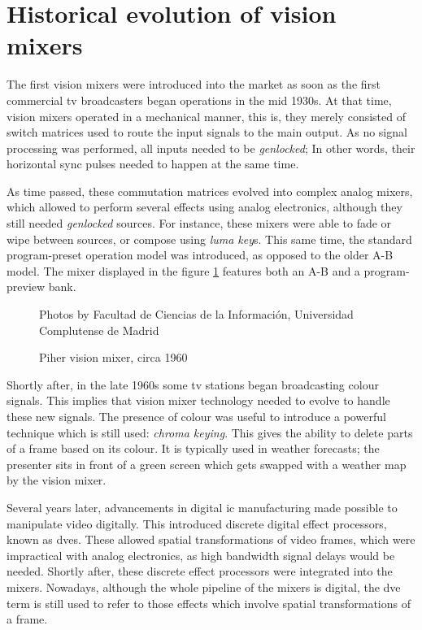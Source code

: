\documentclass[../main.tex]{subfiles}
\begin{document}
\section{Historical evolution of vision mixers}
The first vision mixers were introduced into the market as soon as the first commercial \gls{tv} broadcasters began operations in the mid 1930s. At that time, vision mixers operated in a mechanical manner, this is, they merely consisted of switch matrices used to route the input signals to the main output. As no signal processing was performed, all inputs needed to be \textit{genlocked}; In other words, their horizontal sync pulses needed to happen at the same time\cite{becg2020}.\newline

As time passed, these commutation matrices evolved into complex analog mixers, which allowed to perform several effects using analog electronics, although they still needed \textit{genlocked} sources. For instance, these mixers were able to fade or wipe between sources, or compose using \textit{luma key}s\cite{WardPeter2001Saob}. This same time, the standard program-preset operation model was introduced, as opposed to the older A-B model. The mixer displayed in the figure \ref{fig:piher} features both an A-B and a program-preview bank.\newline

\begin{figure}[htbp]
    \centering
    \footnotesize{Photos by Facultad de Ciencias de la Información, Universidad Complutense de Madrid}

    \caption{Piher vision mixer, circa 1960}
    \label{fig:piher}
\end{figure}

Shortly after, in the late 1960s some \gls{tv} stations began broadcasting colour signals. This implies that vision mixer technology needed to evolve to handle these new signals. The presence of colour was useful to introduce a powerful technique which is still used: \textit{chroma keying}\cite{jpeters}\cite{tmMixerHistory}. This gives the ability to delete parts of a frame based on its colour. It is typically used in weather forecasts; the presenter sits in front of a green screen which gets swapped with a weather map by the vision mixer.\newline

Several years later, advancements in digital \gls{ic} manufacturing made possible to manipulate video digitally\cite{kitplus2015}. This introduced discrete digital effect processors, known as \glspl{dve}. These allowed spatial transformations of video frames, which were impractical with analog electronics, as high bandwidth signal delays would be needed. Shortly after, these discrete effect processors were integrated into the mixers. Nowadays, although the whole pipeline of the mixers is digital, the \gls{dve} term is still used to refer to those effects which involve spatial transformations of a frame\cite{OwensJim2020Tp}\cite{UtterbackAndrew2015STPa}.\newline
\end{document}
